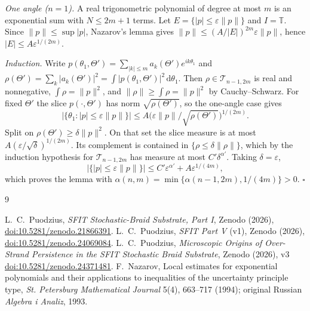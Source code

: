 \documentclass[11pt]{article}
\theoremstyle{remark}\newtheorem{remark}[theorem]{Remark}
\newcommand{\dd}{\mathrm d}
\begin{document}
\emph{One angle ($n=1$).} A real trigonometric polynomial of degree at most $m$ is an exponential sum with $N\le2m+1$ terms. Let $E=\{|p|\le\varepsilon\|p\|\}$ and $I=\mathbb T$. Since $\|p\|\le\sup|p|$, Nazarov's lemma gives $\|p\|\le(A/|E|)^{2m}\varepsilon\|p\|$, hence $|E|\le A\varepsilon^{1/(2m)}$.

\emph{Induction.} Write $p(\theta_1,\Theta')=\sum_{|k|\le m}a_k(\Theta')e^{ik\theta_1}$ and $\rho(\Theta')=\sum_k|a_k(\Theta')|^2=\int|p(\theta_1,\Theta')|^2\,\dd\theta_1$. Then $\rho\in\mathcal T_{n-1,2m}$ is real and nonnegative, $\int\rho=\|p\|^2$, and $\|\rho\|\ge\int\rho=\|p\|^2$ by Cauchy--Schwarz. For fixed $\Theta'$ the slice $p(\cdot,\Theta')$ has norm $\sqrt{\rho(\Theta')}$, so the one-angle case gives
\[
\bigl|\{\theta_1:|p|\le\varepsilon\|p\|\}\bigr|\le A\bigl(\varepsilon\|p\|/\sqrt{\rho(\Theta')}\bigr)^{1/(2m)}.
\]
Split on $\rho(\Theta')\ge\delta\|p\|^2$. On that set the slice measure is at most $A(\varepsilon/\sqrt\delta)^{1/(2m)}$. Its complement is contained in $\{\rho\le\delta\|\rho\|\}$, which by the induction hypothesis for $\mathcal T_{n-1,2m}$ has measure at most $C'\delta^{\alpha'}$. Taking $\delta=\varepsilon$,
\[
\bigl|\{|p|\le\varepsilon\|p\|\}\bigr|\le C'\varepsilon^{\alpha'}+A\varepsilon^{1/(4m)},
\]
which proves the lemma with $\alpha(n,m)=\min\{\alpha(n-1,2m),1/(4m)\}>0$. \hfill$\square$

\begin{thebibliography}{9}\raggedright
{} L.~C.~Puodzius, \emph{SFIT Stochastic-Braid Substrate, Part I}, Zenodo (2026), \href{https://doi.org/10.5281/zenodo.21866391}{doi:10.5281/zenodo.21866391}.
 L.~C.~Puodzius, \emph{SFIT Part V} (v1), Zenodo (2026), \href{https://doi.org/10.5281/zenodo.24069084}{doi:10.5281/zenodo.24069084}.
 L.~C.~Puodzius, \emph{Microscopic Origins of Over-Strand Persistence in the SFIT Stochastic Braid Substrate}, Zenodo (2026), v3 \href{https://doi.org/10.5281/zenodo.24371481}{doi:10.5281/zenodo.24371481}.
 F.~Nazarov, Local estimates for exponential polynomials and their applications to inequalities of the uncertainty principle type, \emph{St. Petersburg Mathematical Journal} 5(4), 663--717 (1994); original Russian \emph{Algebra i Analiz}, 1993.
\end{thebibliography}
\end{document}
